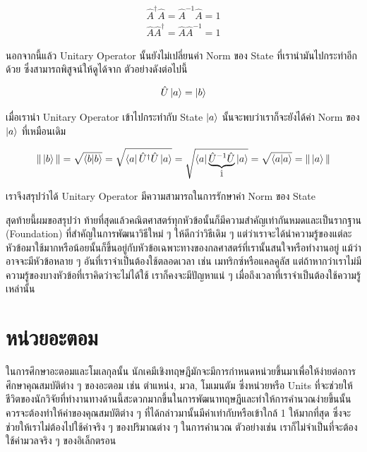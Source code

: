 \begin{equation}
  \begin{split}
    \hat{A}^\dagger \hat{A} = \hat{A}^{-1} \hat{A} = 1 \\
    \hat{A} \hat{A}^\dagger = \hat{A} \hat{A}^{-1} = 1
  \end{split}
\end{equation}

\noindent นอกจากนี้แล้ว Unitary Operator นั้นยังไม่เปลี่ยนค่า Norm ของ State ที่เรานำมันไปกระทำอีกด้วย ซึ่งสามารถพิสูจน์ให้ดูได้จาก%
ตัวอย่างดังต่อไปนี้

\begin{equation}
  \hat{U} \ket{a}
  =
  \ket{b}
\end{equation}

\noindent เมื่อเรานำ Unitary Operator เข้าไปกระทำกับ State $\ket{a}$ นั้นจะพบว่าเราก็จะยังได้ค่า Norm ของ $\ket{a}$ ที่เหมือนเดิม

\begin{equation}
  \| \ket{b} \|
  =
  \sqrt{\braket{b}{b}}
  =
  \sqrt{\bra{a}\hat{U}^\dagger \hat{U} \ket{a}}
  =
  \sqrt{\bra{a} \underbrace{\hat{U}^{-1} \hat{U}}_{\hat{1}} \ket{a}}
  =
  \sqrt{\braket{a}{a}}
  =
  \| \ket{a} \|
\end{equation}

\noindent เราจึงสรุปว่าได้ Unitary Operator มีความสามารถในการรักษาค่า Norm ของ State

สุดท้ายนี้ผมขอสรุปว่า ท้ายที่สุดแล้วคณิตศาสตร์ทุกหัวข้อนั้นก็มีความสำคัญเท่ากันหมดและเป็นรากฐาน (Foundation) ที่สำคัญในการพัฒนาวิธีใหม่ ๆ
ให้ดีกว่าวิธีเดิม ๆ แต่ว่าเราจะได้นำความรู้ของแต่ละหัวข้อมาใช้มากหรือน้อยนั้นก็ขึ้นอยู่กับหัวข้อเฉพาะทางของกลศาสตร์ที่เรานั้นสนใจหรือทำงานอยู่
แม้ว่าอาจจะมีหัวข้อหลาย ๆ อันที่เราจำเป็นต้องใช้ตลอดเวลา เช่น เมทริกซ์หรือแคลคูลัส แต่ถ้าหากว่าเราไม่มีความรู้ของบางหัวข้อที่เราคิดว่าจะไม่ได้ใช้
เราก็คงจะมีปัญหาแน่ ๆ เมื่อถึงเวลาที่เราจำเป็นต้องใช้ความรู้เหล่านั้น

\section{หน่วยอะตอม}

ในการศึกษาอะตอมและโมเลกุลนั้น นักเคมีเชิงทฤษฎีมักจะมีการกำหนดหน่วยขึ้นมาเพื่อให้ง่ายต่อการศึกษาคุณสมบัติต่าง ๆ ของอะตอม เช่น ตำแหน่ง,
มวล, โมเมนตัม ซึ่งหน่วยหรือ Units ที่จะช่วยให้ชีวิตของนักวิจัยที่ทำงานทางด้านนี้สะดวกมากขึ้นในการพัฒนาทฤษฎีและทำให้การคำนวณง่ายขึ้นนั้น%
ควรจะต้องทำให้ค่าของคุณสมบัติต่าง ๆ ที่ได้กล่าวมานั้นมีค่าเท่ากับหรือเข้าใกล้ 1 ให้มากที่สุด ซึ่งจะช่วยให้เราไม่ต้องไปใช้ค่าจริง ๆ ของปริมาณต่าง ๆ
ในการคำนวณ ตัวอย่างเช่น เราก็ไม่จำเป็นที่จะต้องใช้ค่ามวลจริง ๆ ของอิเล็กตรอน

